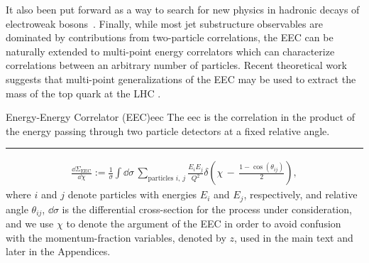 %
It also been put forward as a way to search for new physics in hadronic decays of electroweak bosons~\cite{Ricci:2022htc}.
%
Finally, while most jet substructure observables are dominated by contributions from two-particle correlations, the EEC can be naturally extended to multi-point energy correlators which can characterize correlations between an arbitrary number of particles.
%
Recent theoretical work suggests that multi-point generalizations of the EEC may be used to extract the mass of the top quark at the LHC \cite{Procura:2022fid,Holguin:2022epo,Holguin:2023bjf,Pathak:2023tmy,Xiao:2024rol,Holguin:2024tkz}.





\begin{definitionbox}{Energy-Energy Correlator (EEC)}{eec}
    The \gls{eec} is the correlation in the product of the energy passing through two particle detectors at a fixed relative angle.

    \vspace{7pt}
    \hrule
    \vspace{7pt}


    \begin{align}
        \label{eq:app:EEC:def}
        \frac{\dd \Sigma_\text{EEC}}{\dd \chi}
        :=
        \frac{1}{\sigma}
        \int \dd \sigma
        \,
        \sum_{\text{particles } i,\,j}
        \frac{E_i E_j}{Q^2}
        \delta\left(\chi \, - \, \frac{1-\cos(\theta_{ij})}{2}\right)
        ,
    \end{align}
    where \(i\) and \(j\) denote particles with energies \(E_i\) and \(E_j\), respectively, and relative angle \(\theta_{ij}\), \(\dd\sigma\) is the differential cross-section for the process under consideration, and we use \(\chi\) to denote the argument of the EEC in order to avoid confusion with the momentum-fraction variables, denoted by \(z\), used in the main text and later in the Appendices.
\end{definitionbox}

